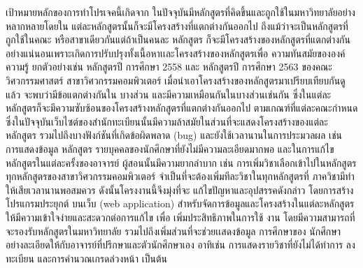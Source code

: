 \maketitle
\makesignature

\ifproject
\begin{abstractTH}
    เป้าหมายหลักของการทําโปรเจคนี้เกิดจาก ในปัจจุบันมีหลักสูตรที่คิดขึ้นและถูกใช้ในมหาวิทยาลัยอย่าง หลากหลายโดยใน
    แต่ละหลักสูตรนั้นก็จะมีโครงสร้างที่แตกต่างกันออกไป ถึงแม้ว่าจะเป็นหลักสูตรที่ถูกใช้ในคณะ หรือสาขาเดียวกันแต่ถ้าเป็นคนละ
    หลักสูตร ก็จะมีโครงสร้างของหลักสูตรที่แตกต่างกันอย่างแน่นอนเพราะเกิดการปรับปรุงทั้งเนื้อหาเเละโครงสร้างของหลักสูตรเพื่อ
    ความทันสมัยขององค์ความรู้ ยกตัวอย่างเช่น หลักสูตรปี การศึกษา 2558 และ หลักสูตรปี การศึกษา 2563 ของคณะ
    วิศวกรรมศาสตร์ สาขาวิศวกรรมคอมพิวเตอร์ เมื่อนําเอาโครงสร้างของหลักสูตรมาเปรียบเทียบกันดูแล้ว จะพบว่ามีข้อแตกต่างกันใน
    บางส่วน และมีความเหมือนกันในบางส่วนเช่นกัน ซึ่งในแต่ละหลักสูตรก็จะมีความซับซ้อนของโครงสร้างหลักสูตรที่แตกต่างกันออกไป
    ตามเกณฑ์ที่แต่ละคณะกําหนด ซึ่งในปัจจุบันเว็บไซต์ของสํานักทะเบียนนั้นมีความล้าสมัยในส่วนที่จะแสดงโครงสร้างของแต่ละ
    หลักสูตร รวมไปถึงบางฟังก์ชันที่เกิดข้อผิดพลาด (bug) และยังใช้เวลานานในการประมวลผล เช่น การแสดงข้อมูล หลักสูตร
    รายบุคคลของนักศึกษาที่ยังไม่มีความละเอียดมากพอ และในการแก้ไขหลักสูตรในแต่ละครั้งของอาจารย์ ผู้สอนนั้นมีความยากลําบาก
    เช่น การเพิ่มวิชาเลือกเข้าไปในหลักสูตรทุกหลักสูตรของสาขาวิศวกรรมคอมพิวเตอร์ จําเป็นที่จะต้องเพิ่มทีละวิชาในทุกหลักสูตรที่
    ภาควิชามีทําให้เสียเวลานานพอสมควร ดังนั้นโครงงานนี้จึงมุ่งที่จะ แก้ไขปัญหาและอุปสรรคดังกล่าว โดยการสร้างโปรแกรมประยุกต์
    บนเว็บ (web application) สําหรับจัดการข้อมูลและโครงสร้างในแต่ละหลักสูตรให้มีความเข้าใจง่ายและสะดวกต่อการแก้ไข เพื่อ
    เพิ่มประสิทธิภาพในการใช้ งาน โดยมีความสามารถที่จะรองรับหลักสูตรในมหาวิทยาลัย รวมไปถึงเพิ่มส่วนที่จะช่วยเเสดงข้อมูล
    การศึกษาของ นักศึกษาอย่างละเอียดให้กับอาจารย์ที่ปรึกษาและตัวนักศึกษาเอง อาทิเช่น การแสดงรายวิชาที่ยังไม่ได้ทําการ
    ลงทะเบียน และการคํานวณเกรดล่วงหน้า เป็นต้น
\end{abstractTH}

